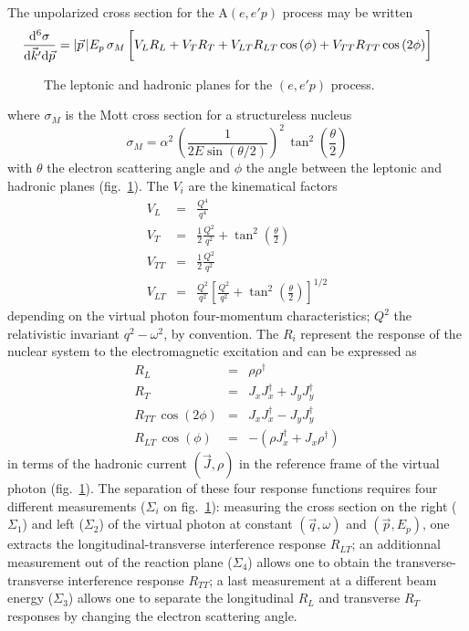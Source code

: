 \documentclass{elsart}
\begin{document}
The unpolarized cross section for the A$(e,e'p)$ process may be written
\begin{equation}
\hspace{-15pt}\frac{{\mathrm d}^6\sigma}{{\mathrm d}{\vec k}'{\mathrm d}
{\vec p}} = \vert {\vec p} \,\vert E_p \, \sigma_M\,\bigg[ V_L R_L + V_T R_T + 
V_{LT} R_{LT} \cos{(\phi)} + V_{TT} R_{TT} \cos{(2\phi)} \bigg]
\end{equation}
\begin{figure}[ht]
\begin{center}
\caption{The leptonic and hadronic planes for the $(e,e'p)$ process.} 
\label{reaction}
\end{center}
\end{figure}
where $\sigma_M$ is the Mott cross section for a structureless nucleus
\begin{equation}
\sigma_M = \alpha^2  \, {\left( \frac{1}{2 E \sin(\theta/2)} \right)}^2 
\, \tan^2 \left( \frac{\theta}{2} \right) 
\end{equation}
with $\theta$ the electron scattering angle and $\phi$ the angle between the 
leptonic and hadronic planes (fig.~\ref{reaction}). The $V_i$ are the 
kinematical factors 
\begin{eqnarray}
V_L & = & \frac{Q^4}{q^4} \\
V_T & = & \frac{1}{2} \frac{Q^2}{q^2} + \tan^2 \left(\frac{\theta}{2}\right) \\
V_{TT} & = & \frac{1}{2} \frac{Q^2}{q^2} \\
V_{LT} & = & \frac{Q^2}{q^2} \left[ \frac{Q^2}{q^2}+ \tan^2 \left(\frac{\theta}{2} 
\right) \right]^{1/2}
\end{eqnarray}
depending on the virtual photon four-momentum characteristics; $Q^2$ the 
relativistic invariant $q^2-\omega^2$, by convention. The $R_i$ represent the 
response of the nuclear system to the electromagnetic excitation and can be
expressed as   
\begin{eqnarray}
R_L & = & \rho \rho^{\dagger} \\
R_T & = & J_xJ_x^{\dagger}+J_yJ_y^{\dagger} \\
R_{TT} \, \cos(2\phi) & = & J_xJ_x^{\dagger}-J_yJ_y^{\dagger} \\
R_{LT} \, \cos(\phi) & = & -(\rho J_x^{\dagger}+J_x\rho^{\dagger})
\end{eqnarray}
in terms of the hadronic current $({\vec J},\rho)$ in the reference frame of 
the virtual photon (fig.~\ref{reaction}). The separation of these four response
functions requires four different measurements ($\Sigma_i$ on
fig.~\ref{reaction}): measuring the cross section on 
the right ($\Sigma_1$) and  left ($\Sigma_2$) of the virtual photon at constant 
$({\vec q},\omega)$ and $({\vec p},E_p)$, one extracts the 
longitudinal-transverse interference response $R_{LT}$; an additionnal 
measurement out of the reaction plane ($\Sigma_4$) allows one to obtain the
transverse-transverse interference response $R_{TT}$; a last measurement at a 
different beam energy ($\Sigma_3$) allows one to separate the longitudinal 
$R_L$ and transverse $R_T$ responses by changing the electron scattering angle.  
\end{document}
